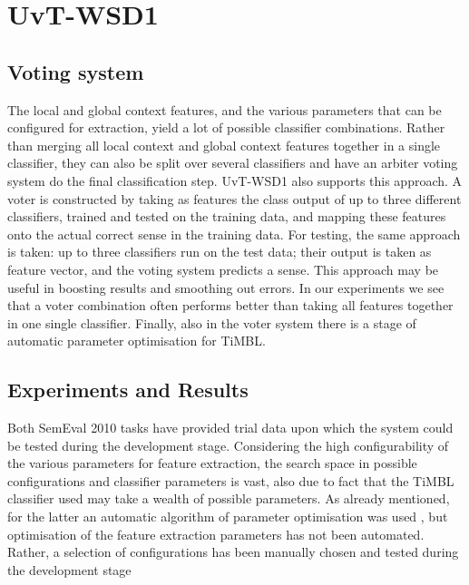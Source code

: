 \section{UvT-WSD1}
\label{sec:wsd1}

\subsection{Voting system}

The local and global context features, and the various parameters that can be
configured for extraction, yield a lot of possible classifier combinations.
Rather than merging all local context and global context features together in a
single classifier, they can also be split over several classifiers and have an
arbiter voting system do the final classification step. UvT-WSD1 also supports
this approach. A voter is constructed by taking as features the class output of
up to three different classifiers, trained and tested on the training data, and
mapping these features onto the actual correct sense in the training data. For
testing, the same approach is taken: up to three classifiers run on the test
data; their output is taken as feature vector, and the voting system predicts a
sense. This approach may be useful in boosting results and smoothing out
errors. In our experiments we see that a voter combination often performs
better than taking all features together in one single classifier. Finally,
also in the voter system there is a stage of automatic parameter optimisation
for TiMBL.

\subsection{Experiments and Results}

Both SemEval 2010 tasks have provided trial data upon which the system could be
tested during the development stage. Considering the high configurability of
the various parameters for feature extraction, the search space in possible
configurations and classifier parameters is vast, also due to fact that the
TiMBL classifier used may take a wealth of possible parameters. As already
mentioned, for the latter an automatic algorithm of parameter optimisation was
used \citep{PARAMSEARCH}, but optimisation of the feature extraction parameters
has not been automated. Rather, a selection of configurations has been manually
chosen and tested during the development stage


